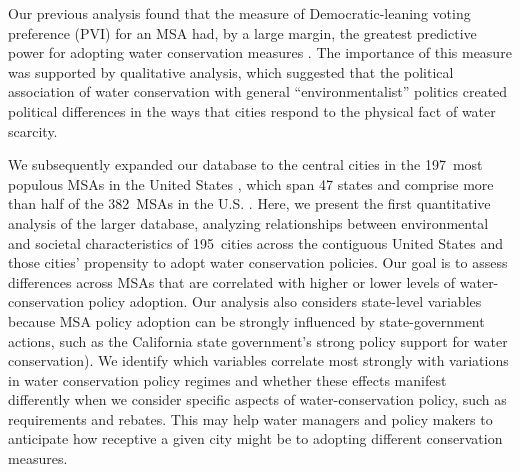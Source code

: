 \documentclass[draft,linenumbers]{agujournal}
\begin{document}
%
Our previous analysis found that the measure of Democratic-leaning voting preference (PVI)
for an MSA had, by a large margin,
the greatest predictive power for adopting water conservation measures
\citep{hess:drought:2016}.
The importance of this measure
was supported by qualitative analysis, which suggested that the political
association of water conservation with general ``environmentalist'' politics
created political differences in the ways that cities respond to the physical
fact of water scarcity.

We subsequently expanded our database to the central cities in the
197~most populous MSAs in
the United States \citep{hess:vwci:2017},
which span 47 states and comprise more than half of the 382~MSAs
in the U.S.
\citep{census:population:2015}. Here, we present the first quantitative
analysis of the larger database, analyzing relationships between environmental
and societal characteristics of 195~cities across the contiguous
United States and those cities' propensity to adopt water conservation policies.
Our goal is to assess differences across MSAs that are correlated with higher or
lower levels of water-conservation policy adoption. Our analysis also
considers state-level
variables because MSA policy adoption can be strongly influenced by state-government actions,
such as the California state government's strong policy support for water conservation).
We identify which variables correlate most strongly with variations in water conservation policy
regimes and whether these
effects manifest differently when we consider specific aspects of
water-conservation policy, such as requirements and rebates.
This may help water managers and policy makers to anticipate how
receptive a given city might be to adopting different conservation measures.
\end{document}

